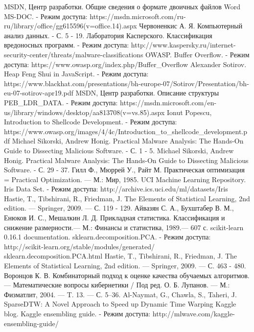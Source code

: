 \begin{thebibliography}{99}
 MSDN, Центр разработки. Общие сведения о формате двоичных файлов Word MS-DOC. - Режим доступа: https://msdn.microsoft.com/ru-ru/library/office/gg615596(v=office.14).aspx
 Червоненкис А. Я. Компьютерный анализ данных. - С. 5 - 19.
 Лаборатория Касперского. Классификация вредоносных программ. - Режим доступа: http://www.kaspersky.ru/internet-security-center/threats/malware-classifications
 OWASP. Buffer Overflow. - Режим доступа: https://www.owasp.org/index.php/Buffer\_Overflow
 Alexander Sotirov. Heap Feng Shui in JavaScript. - Режим доступа: https://www.blackhat.com/presentations/bh-europe-07/Sotirov/Presentation/bh-eu-07-sotirov-apr19.pdf
 MSDN, Центр разработки. Описание структуры PEB\_LDR\_DATA. - Режим доступа: https://msdn.microsoft.com/en-us/library/windows/desktop/aa813708(v=vs.85).aspx
 Ionut Popescu, Introduction to Shellcode Development. - Режим доступа: https://www.owasp.org/images/4/4c/Introduction\_to\_shellcode\_development.pdf
 Michael Sikorski, Andrew Honig. Practical Malware Analysis: The Hands-On Guide to Dissecting Malicious Software. - С. 1 - 5.
 Michael Sikorski, Andrew Honig. Practical Malware Analysis: The Hands-On Guide to Dissecting Malicious Software. - С. 29 - 37.
 Гилл Ф., Мюррей У., Райт М. Практическая оптимизация = Practical Optimization. — М.: Мир, 1985.
 UCI Machine Learning Repository. Iris Data Set. - Режим доступа: http://archive.ics.uci.edu/ml/datasets/Iris
 Hastie, T., Tibshirani, R., Friedman, J. The Elements of Statistical Learning, 2nd edition. — Springer, 2009. — С. 119 - 129.
 Айвазян С. А., Бухштабер В. М., Енюков И. С., Мешалкин Л. Д. Прикладная статистика. Классификация и снижение размерности.— М.: Финансы и статистика, 1989.— 607 с.
 scikit-learn 0.16.1 documentation. sklearn.decomposition.PCA. - Режим доступа: http://scikit-learn.org/stable/modules/generated/\\sklearn.decomposition.PCA.html
 Hastie, T., Tibshirani, R., Friedman, J. The Elements of Statistical Learning, 2nd edition. — Springer, 2009. — С. 463 - 480.
 Воронцов К. В. Комбинаторный подход к оценке качества обучаемых алгоритмов. — Математические вопросы кибернетики / Под ред. О. Б. Лупанов. — М.: Физматлит, 2004. — T. 13. — С. 5–36.
 Al-Naymat, G., Chawla, S., Taheri, J. SparseDTW: A Novel Approach to Speed up Dynamic Time Warping
 Kaggle blog. Kaggle ensembling guide. - Режим доступа: http://mlwave.com/kaggle-ensembling-guide/
\end{thebibliography}